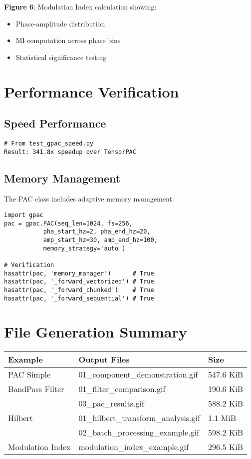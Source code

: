 \documentclass[11pt,a4paper]{article}
\begin{document}
\textbf{Figure 6}: Modulation Index calculation showing:
\begin{itemize}
\item Phase-amplitude distribution
\item MI computation across phase bins
\item Statistical significance testing
\end{itemize}

\section{Performance Verification}
\label{sec:orgab0f858}

\subsection{Speed Performance}
\label{sec:org6e170e5}

\begin{verbatim}
# From test_gpac_speed.py
Result: 341.8x speedup over TensorPAC
\end{verbatim}

\subsection{Memory Management}
\label{sec:orgc165102}

The PAC class includes adaptive memory management:

\begin{verbatim}
import gpac
pac = gpac.PAC(seq_len=1024, fs=256, 
	       pha_start_hz=2, pha_end_hz=20,
	       amp_start_hz=30, amp_end_hz=100,
	       memory_strategy='auto')

# Verification
hasattr(pac, 'memory_manager')      # True
hasattr(pac, '_forward_vectorized') # True
hasattr(pac, '_forward_chunked')    # True
hasattr(pac, '_forward_sequential') # True
\end{verbatim}

\section{File Generation Summary}
\label{sec:org93db5fe}

\begin{center}
\begin{tabular}{lll}
Example & Output Files & Size\\
\hline
PAC Simple & 01\_component\_demonstration.gif & 547.6 KiB\\
BandPass Filter & 01\_filter\_comparison.gif & 190.6 KiB\\
 & 03\_pac\_results.gif & 588.2 KiB\\
Hilbert & 01\_hilbert\_transform\_analysis.gif & 1.1 MiB\\
 & 02\_batch\_processing\_example.gif & 598.2 KiB\\
Modulation Index & modulation\_index\_example.gif & 296.5 KiB\\
\end{tabular}
\end{center}
\end{document}
